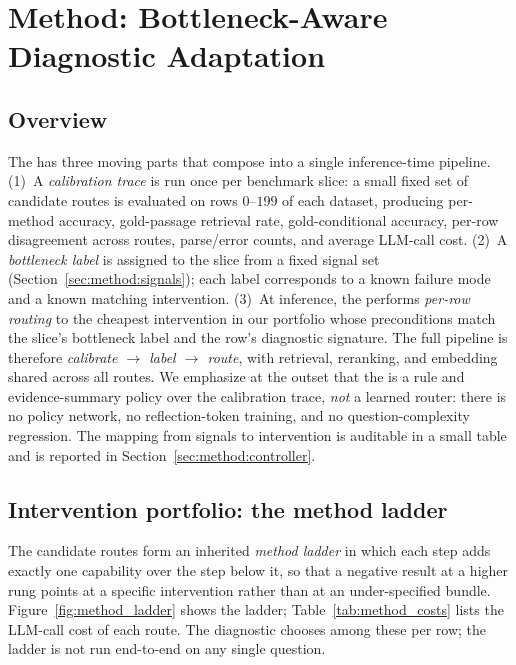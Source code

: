 \section{Method: Bottleneck-Aware Diagnostic Adaptation}\label{sec:method}

\subsection{Overview}

The \framework{} has three moving parts that compose into a single
inference-time pipeline. (1)~A \emph{calibration trace} is run once per
benchmark slice: a small fixed set of candidate routes is evaluated on rows
$0$--$199$ of each dataset, producing per-method accuracy, gold-passage
retrieval rate, gold-conditional accuracy, per-row disagreement across
routes, parse/error counts, and average LLM-call cost. (2)~A
\emph{bottleneck label} is assigned to the slice from a fixed signal set
(Section~\ref{sec:method:signals}); each label corresponds to a known
failure mode and a known matching intervention. (3)~At inference, the
\controller{} performs \emph{per-row routing} to the cheapest intervention
in our portfolio whose preconditions match the slice's bottleneck label
and the row's diagnostic signature. The full pipeline is therefore
\emph{calibrate $\rightarrow$ label $\rightarrow$ route}, with retrieval,
reranking, and embedding shared across all routes. We emphasize at the
outset that the \controller{} is a rule and evidence-summary policy over
the calibration trace, \emph{not} a learned router: there is no policy
network, no reflection-token training, and no question-complexity
regression. The mapping from signals to intervention is auditable in a
small table and is reported in Section~\ref{sec:method:controller}.

\subsection{Intervention portfolio: the method ladder}\label{sec:method:ladder}

The candidate routes form an inherited \emph{method ladder} in which each
step adds exactly one capability over the step below it, so that a
negative result at a higher rung points at a specific intervention rather
than at an under-specified bundle. Figure~\ref{fig:method_ladder} shows
the ladder; Table~\ref{tab:method_costs} lists the LLM-call cost of each
route. The diagnostic \controller{} chooses among these per row; the
ladder is not run end-to-end on any single question.

